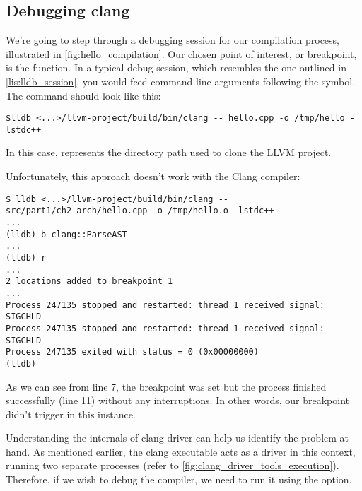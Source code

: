 \subsection{Debugging clang}
We're going to step through a debugging session for our compilation process,
illustrated in \cref{fig:hello_compilation}. Our chosen point of interest, or
breakpoint, is the  function. In a typical debug
session, which resembles the one outlined in \cref{lis:lldb_session}, you would
feed command-line arguments following the \myshell{--} symbol. The command
should look like this: 

\begin{adjustwidth}{0em}{0em}
\begin{verbatim}
$lldb <...>/llvm-project/build/bin/clang -- hello.cpp -o /tmp/hello -lstdc++
\end{verbatim}
\end{adjustwidth}

In this case,  represents the directory path used to clone the
LLVM project. 

Unfortunately, this approach doesn't work with the Clang compiler:
\begin{verbatim}
$ lldb <...>/llvm-project/build/bin/clang -- src/part1/ch2_arch/hello.cpp -o /tmp/hello.o -lstdc++
...
(lldb) b clang::ParseAST
...
(lldb) r
...
2 locations added to breakpoint 1
...
Process 247135 stopped and restarted: thread 1 received signal: SIGCHLD
Process 247135 stopped and restarted: thread 1 received signal: SIGCHLD
Process 247135 exited with status = 0 (0x00000000) 
(lldb) 
\end{verbatim}
As we can see from line 7, the breakpoint was set but the process finished
successfully (line 11) without any interruptions. In other words, our breakpoint
didn't trigger in this instance.

Understanding the internals of clang-driver can help us identify the problem at
hand. As mentioned earlier, the clang executable acts as a driver in this
context, running two separate processes (refer to
\cref{fig:clang_driver_tools_execution}). Therefore, if we wish to debug the
compiler, we need to run it using the  option.

